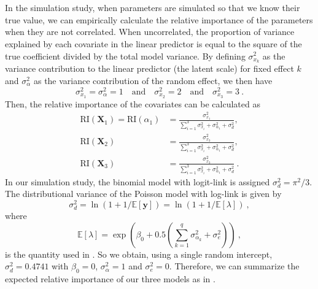 \\
\\
In the simulation study, when parameters are simulated so that we know their true value, we can empirically calculate the relative importance of the parameters when they are not correlated. When uncorrelated, the proportion of variance explained by each covariate in the linear predictor is equal to the square of the true coefficient divided by the total model variance. By defining $\sigma_{x_k}^2$ as the variance contribution to the linear predictor (the latent scale) for fixed effect $k$ and $\sigma^2_{\alpha}$ as the variance contribution of the random effect, we then have 
\begin{equation}
    \sigma_{x_1}^2 = \sigma_{\alpha}^2  = 1 \quad \text{and} \quad \sigma_{x_2}^2 = 2 \quad \text{and} \quad \sigma_{x_3}^2 = 3 \ .
\end{equation}
Then, the relative importance of the covariates can be calculated as
\begin{equation}
    \begin{aligned}
        \text{RI}(\mathbf{X}_{1})  = \text{RI}(\alpha_1)  &= \frac{\sigma_{x_1}^2}{\sum_{i=1}^{3}\sigma_{x_i}^2 +\sigma_{\alpha_1}^2  + \sigma_d^2}, \\
        \text{RI}(\mathbf{X}_2) &= \frac{\sigma_{x_3}^2}{\sum_{i=1}^{3}\sigma_{x_i}^2 +\sigma_{\alpha_1}^2 +  \sigma_d^2}, \\
        \text{RI}(\mathbf{X}_3) &= \frac{\sigma_{x_3}^2}{\sum_{i=1}^{3}\sigma_{x_i}^2 +\sigma_{\alpha_1}^2 +  \sigma_d^2} \ .
    \end{aligned}
\end{equation}
In our simulation study, the binomial model with logit-link is assigned $\sigma^2_d=\pi^2/3$. The distributional variance of the Poisson model with log-link is given by 
\begin{equation}
    \sigma_d^2 = \ln (1 + 1/\mathbb{E}[\mathbf{y}]) = \ln (1 + 1/\mathbb{E}[\lambda]) \ ,
\end{equation}
where 
\begin{equation}
    \label{eq:lambda}
    \mathbb{E}[\lambda]=\exp\left(\beta_0 + 0.5 (\sum_{k=1}^q \sigma_{\alpha_k}^2 + \sigma^2_e)\right) \ ,
\end{equation}
is the quantity used in  \citep{nakagawa2017}. So we obtain, using a single random intercept, $\sigma_{d}^2=0.4741$ with $\beta_0=0$, $\sigma^2_{\alpha}=1$ and $\sigma^2_e=0$. Therefore, we can summarize the expected relative importance of our three models as in .

